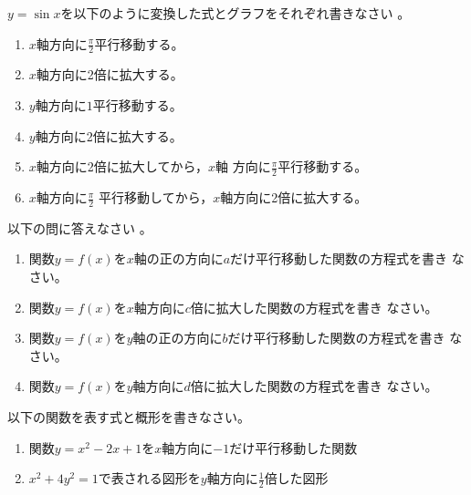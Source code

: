 \documentclass[twocolumn,11pt]{jarticle}
\begin{document}
\nquestion
$y=\sin x$を以下のように変換した式とグラフをそれぞれ書きなさい
。
\begin{enumerate}
\item\label{item:MoveSin} $x$軸方向に$\displaystyle\frac{\pi}{2}$平行移動する。
\item\label{item:StretchSin} $x$軸方向に2倍に拡大する。
\item\label{item:MoveSinY} $y$軸方向に$1$平行移動する。
\item\label{item:StretchSinY} $y$軸方向に2倍に拡大する。
\item\label{itme:StretchMove} $x$軸方向に2倍に拡大してから，$x$軸
  方向に$\displaystyle\frac{\pi}{2}$平行移動する。 
\item\label{item:MoveStretch} $x$軸方向に$\displaystyle\frac{\pi}{2}$
  平行移動してから，$x$軸方向に2倍に拡大する。
\end{enumerate}

\nquestion 以下の問に答えなさい
。
\begin{enumerate}
\item\label{item:MoveX}
 関数$y=f(x)$を$x$軸の正の方向に$a$だけ平行移動した関数の方程式を書き
  なさい。
\item\label{item:StretchX}
  関数$y=f(x)$を$x$軸方向に$c$倍に拡大した関数の方程式を書き
  なさい。
\item\label{item:MoveY}
  関数$y=f(x)$を$y$軸の正の方向に$b$だけ平行移動した関数の方程式を書き
  なさい。
\item\label{item:StretchY}
 関数$y=f(x)$を$y$軸方向に$d$倍に拡大した関数の方程式を書き
  なさい。
\end{enumerate}

\nquestion
以下の関数を表す式と概形を書きなさい。
\begin{enumerate}
\item 関数$y=x^2-2x+1$を$x$軸方向に$-1$だけ平行移動した関数
\item $x^2+4y^2=1$で表される図形を$y$軸方向に$\frac{1}{2}$倍した図形
\end{enumerate}
\end{document}
